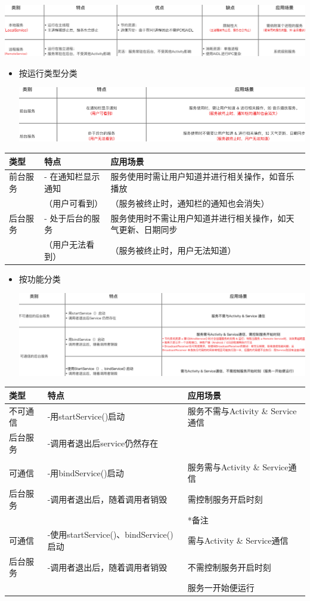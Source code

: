 \documentclass[9pt, b5paper]{article}
\begin{document}
\includegraphics[width=.9\linewidth]{./pic/location.png}
\begin{itemize}
\item 按运行类型分类

\includegraphics[width=.9\linewidth]{./pic/category.png}
\end{itemize}
\begin{center}
\begin{tabular}{lll}
\hline
类型 & 特点 & 应用场景\\
\hline
前台服务 & - 在通知栏显示通知 & 服务使用时需让用户知道并进行相关操作，如音乐播放\\
 & （用户可看到） & （服务被终止时，通知栏的通知也会消失）\\
\hline
后台服务 & - 处于后台的服务 & 服务使用时不需让用户知道并进行相关操作，如天气更新、日期同步\\
 & （用户无法看到） & （服务被终止时，用户无法知道）\\
\hline
\end{tabular}
\end{center}
\begin{itemize}
\item 按功能分类

\includegraphics[width=.9\linewidth]{./pic/function.png}
\end{itemize}
\begin{center}
\begin{tabular}{lll}
\hline
类型 & 特点 & 应用场景\\
\hline
不可通信 & -用startService()启动 & 服务不需与Activity \& Service通信\\
后台服务 & -调用者退出后service仍然存在 & \\
 &  & \\
\hline
可通信 & -用bindService()启动 & 服务需与Activity \& Service通信\\
后台服务 & -调用者退出后，随着调用者销毁 & 需控制服务开启时刻\\
 &  & *备注\\
\hline
可通信 & -使用startService()、bindService()启动 & 需与Activity \& Service通信\\
后台服务 & -调用者退出后，随着调用者销毁 & 不需控制服务开启时刻\\
 &  & 服务一开始便运行\\
\hline
\end{tabular}
\end{center}
\end{document}
